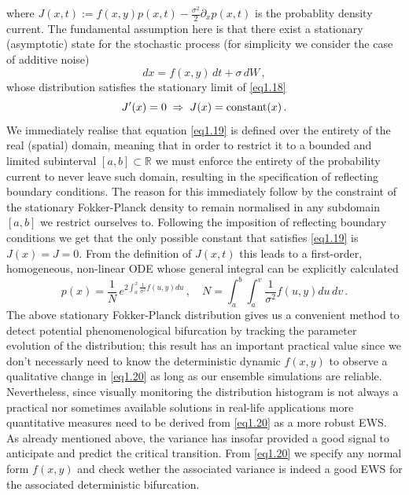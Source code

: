 \documentclass[../main.tex]{subfiles}
\begin{document}
where $J(x,t):= f(x,y)p(x,t) - \frac{\sigma^{2}}{2}\partial_{x}p(x,t)$ is the probablity density current. The fundamental assumption here is that there exist a stationary (asymptotic) state for the stochastic process (for simplicity we consider the case of additive noise) 
\begin{equation*}
    dx = f(x,y)\,dt + \sigma\,dW\,,
\end{equation*}
whose distribution satisfies the stationary limit of \eqref{eq1.18}
\begin{equation}\label{eq1.19}
     J'(x) = 0\;\Rightarrow\; J(x) = \text{constant}(x)\,. 
\end{equation}
We immediately realise that equation \eqref{eq1.19} is defined over the entirety of the real (spatial) domain, meaning that in order to restrict it to a bounded and limited subinterval $[a,b]\subset \mathbb{R}$ we must enforce the entirety of the probability current to never leave such domain, resulting in the specification of reflecting boundary conditions. 
The reason for this immediately follow by the constraint of the stationary Fokker-Planck density to remain normalised in any subdomain $[a,b]$ we restrict ourselves to.
Following the imposition of reflecting boundary conditions we get that the only possible constant that satisfies \eqref{eq1.19} is $J(x)=J=0$. From the definition of $J(x,t)$ this leads to a first-order, homogeneous, non-linear ODE whose general integral can be explicitly calculated
\begin{equation}\label{eq1.20}
     p(x)=\frac{1}{N}\,e^{2 \int_{a}^{x}\frac{1}{\sigma^{2}}f(u,y)du}\,,\quad N = \int_{a}^{b}\int_{a}^{v}\frac{1}{\sigma^{2}}f(u,y)du\,dv\,.
\end{equation}
The above stationary Fokker-Planck distribution gives us a convenient method to detect potential phenomenological bifurcation by tracking the parameter evolution of the distribution; this result has an important practical value since we don't necessarly need to know the deterministic dynamic $f(x,y)$ to observe a qualitative change in \eqref{eq1.20} as long as our ensemble simulations are reliable.
Nevertheless, since visually monitoring the distribution histogram is not always a practical nor sometimes available solutions in real-life applications more quantitative measures need to be derived from \eqref{eq1.20} as a more robust EWS.
As already mentioned above, the variance has insofar provided a good signal to anticipate and predict the critical transition. From \eqref{eq1.20} we specify any normal form $f(x,y)$ and check wether the associated variance is indeed a good EWS for the associated deterministic bifurcation.
\end{document}
